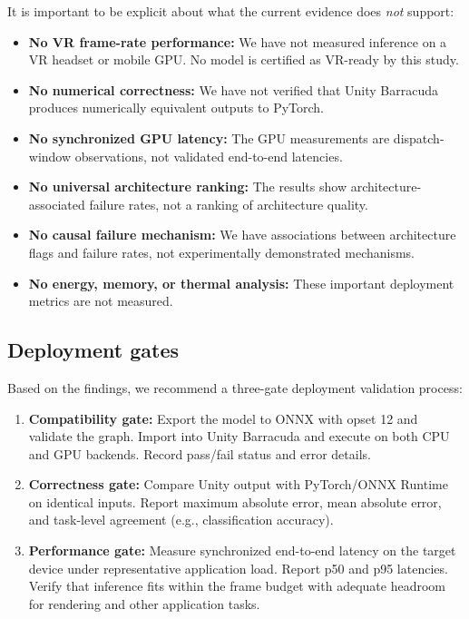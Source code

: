 \documentclass[10pt,twocolumn,letterpaper]{article}
\begin{document}
It is important to be explicit about what the current evidence does \emph{not} support:
\begin{itemize}[nosep,leftmargin=*]
  \item \textbf{No VR frame-rate performance:} We have not measured inference on a VR headset or mobile GPU. No model is certified as VR-ready by this study.
  \item \textbf{No numerical correctness:} We have not verified that Unity Barracuda produces numerically equivalent outputs to PyTorch.
  \item \textbf{No synchronized GPU latency:} The GPU measurements are dispatch-window observations, not validated end-to-end latencies.
  \item \textbf{No universal architecture ranking:} The results show architecture-associated failure rates, not a ranking of architecture quality.
  \item \textbf{No causal failure mechanism:} We have associations between architecture flags and failure rates, not experimentally demonstrated mechanisms.
  \item \textbf{No energy, memory, or thermal analysis:} These important deployment metrics are not measured.
\end{itemize}

\subsection{Deployment gates}

Based on the findings, we recommend a three-gate deployment validation process:
\begin{enumerate}[nosep,leftmargin=*]
  \item \textbf{Compatibility gate:} Export the model to ONNX with opset 12 and validate the graph. Import into Unity Barracuda and execute on both CPU and GPU backends. Record pass/fail status and error details.
  \item \textbf{Correctness gate:} Compare Unity output with PyTorch/ONNX Runtime on identical inputs. Report maximum absolute error, mean absolute error, and task-level agreement (e.g., classification accuracy).
  \item \textbf{Performance gate:} Measure synchronized end-to-end latency on the target device under representative application load. Report p50 and p95 latencies. Verify that inference fits within the frame budget with adequate headroom for rendering and other application tasks.
\end{enumerate}
\end{document}
